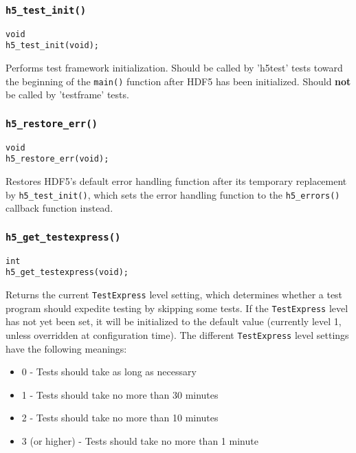 \documentclass[../HDF5_RFC.tex]{subfiles}
\begin{document}
\subsubsection{\texttt{h5\_test\_init()}}
\label{apdx:h5test_h5testinit}

\begin{verbatim}
void
h5_test_init(void);
\end{verbatim}

Performs test framework initialization. Should be called by 'h5test' tests toward the beginning of the \texttt{main()} function after HDF5 has been initialized. Should \textbf{not} be called by 'testframe'
tests.

\subsubsection{\texttt{h5\_restore\_err()}}

\begin{verbatim}
void
h5_restore_err(void);
\end{verbatim}

Restores HDF5's default error handling function after its temporary replacement by
\texttt{h5\_test\_init()}, which sets the error handling function to the \texttt{h5\_errors()}
callback function instead.

\subsubsection{\texttt{h5\_get\_testexpress()}}
\label{apdx:h5test_h5gettestexpress}

\begin{verbatim}
int
h5_get_testexpress(void);
\end{verbatim}

Returns the current \texttt{TestExpress} level setting, which determines whether a test program should
expedite testing by skipping some tests. If the \texttt{TestExpress} level has not yet been set, it will
be initialized to the default value (currently level 1, unless overridden at configuration time). The
different \texttt{TestExpress} level settings have the following meanings:

\begin{itemize}

    \item 0 - Tests should take as long as necessary
    \item 1 - Tests should take no more than 30 minutes
    \item 2 - Tests should take no more than 10 minutes
    \item 3 (or higher) - Tests should take no more than 1 minute

\end{itemize}
\end{document}
